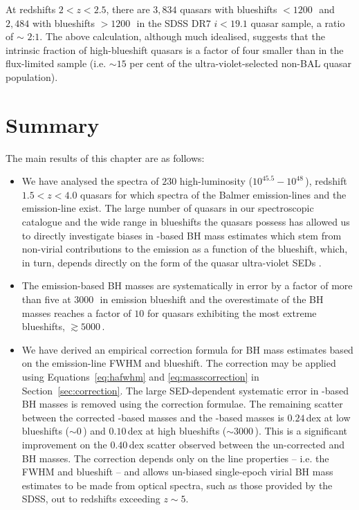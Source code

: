At redshifts $2 < z <2.5$, there are $3,834$ quasars with  blueshifts $<1200$\,\kms\, and $2,484$ with blueshifts $>1200$\,\kms\, in the SDSS DR$7$ $i < 19.1$ quasar sample, a ratio of $\sim$ $2$:$1$.
The above calculation, although much idealised, suggests that the intrinsic fraction of high-blueshift quasars is a factor of four smaller than in the flux-limited sample (i.e. $\sim15$ per cent of the ultra-violet-selected non-BAL quasar population).

\section{Summary}
\label{sec:conclusions}

The main results of this chapter are as follows:

\begin{itemize}

\item We have analysed the spectra of $230$ high-luminosity ($10^{45.5}-10^{48}$\,\ergs), redshift $1.5 < z < 4.0$ quasars for which spectra of the Balmer emission-lines and the  emission-line exist.
The large number of quasars in our spectroscopic catalogue and the wide range in  blueshifts the quasars possess has allowed us to directly investigate biases in -based BH mass estimates which stem from non-virial contributions to the  emission as a function of the  blueshift, which, in turn, depends directly on the form of the quasar ultra-violet SEDs \citep{richards11}.

\item The  emission-based BH masses are systematically in error by a factor of more than five at $3000$\,\kms\, in  emission blueshift and the overestimate of the BH masses reaches a factor of $10$ for quasars exhibiting the most extreme blueshifts, $\gtrsim5000$\,\kms.

\item We have derived an empirical correction formula for BH mass estimates based on the  emission-line FWHM and blueshift.
The correction may be applied using Equations~\ref{eq:hafwhm} and \ref{eq:masscorrection} in Section~\ref{sec:correction}.
The large SED-dependent systematic error in -based BH masses is removed using the correction formulae.
The remaining scatter between the corrected -based masses and the \hans-based masses is $0.24$\,dex at low  blueshifts ($\sim0$\,\kms) and $0.10$\,dex at high blueshifts ($\sim3000$\,\kms).
This is a significant improvement on the $0.40$\,dex scatter observed between the un-corrected  and \ha BH masses.
The correction depends only on the  line properties -- i.e. the FWHM and blueshift -- and allows un-biased single-epoch virial BH mass estimates to be made from optical spectra, such as those provided by the SDSS, out to redshifts exceeding $z\sim 5$.

\end{itemize}

